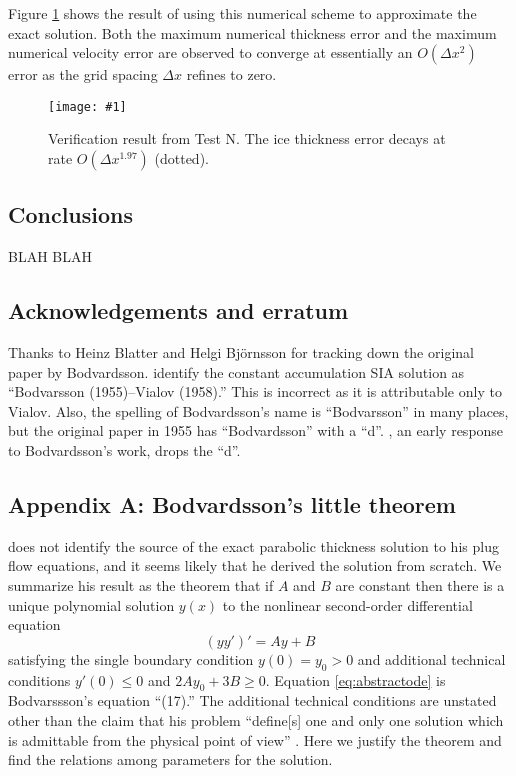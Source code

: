 \documentclass[twocolumn,letterpaper]{igs}
\newcommand{\onecol}[1]{\texttt{[image: \#1]}}
\begin{document}
Figure \ref{fig:verifNresult} shows the result of using this numerical scheme to approximate the exact solution.  Both the maximum numerical thickness error and the maximum numerical velocity error are observed to converge at essentially an $O(\Delta x^2)$ error as the grid spacing $\Delta x$ refines to zero.  

\begin{figure}[ht]
\onecol{verifN}
\caption{Verification result from Test N.  The ice thickness error decays at rate $O(\Delta x^{1.97})$ (dotted).} \label{fig:verifNresult}
\end{figure}


\subsection*{Conclusions} BLAH BLAH

\subsection*{Acknowledgements and erratum}  Thanks to Heinz Blatter and Helgi Bj\"ornsson for tracking down the original paper by Bodvardsson.  \cite{BLKCB} identify the constant accumulation SIA solution as ``Bodvarsson (1955)--Vialov (1958).''  This is incorrect as it is attributable only to Vialov.  Also, the spelling of Bodvardsson's name is ``Bodvarsson'' in many places, but the original paper in 1955 has ``Bodvardsson'' with a ``d''.  \cite{Weertman61stability}, an early response to Bodvardsson's work, drops the ``d''.





\appendix

\subsection{Appendix A: Bodvardsson's little theorem}  \cite{Bodvardsson} does not identify the source of the exact parabolic thickness solution to his plug flow equations, and it seems likely that he derived the solution from scratch.  We summarize his result as the theorem that if $A$ and $B$ are constant then there is a unique polynomial solution $y(x)$ to the nonlinear second-order differential equation
\begin{equation}
  (y y')' = Ay+B  \label{eq:abstractode}
\end{equation}
satisfying the single boundary condition $y(0) = y_0 > 0$ and additional technical conditions $y'(0) \le 0$ and $2A y_0 + 3 B \ge 0$.  Equation \eqref{eq:abstractode} is Bodvarssson's equation ``(17).''  The additional technical conditions are unstated other than the claim that his problem ``define[s] one and only one solution which is admittable from the physical point of view'' \citep{Bodvardsson}.  Here we justify the theorem and find the relations among parameters for the solution.
\end{document}
